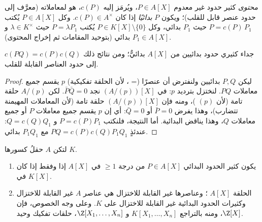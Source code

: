 \begin{definition}\label{def:b3:rings:content}
\emph{محتوى} كثير حدود غير معدوم
$P \in A[X]$، ويُرمَز إليه $c(P)$، هو  لمعاملاته
(معرَّف إلى حدود عنصر قابل للقلب)؛ ويكون $P$ \emph{بدائيًا} إذا
كان $c(P) \in A^\times$. وكل $P
\in A[X]$ يُكتب $P = c(P)\,P_1$ حيث $P_1$
بدائي، وكل $P \in K[X]\setminus\{0\}$ يُكتب $P = \lambda P_1$ حيث $\lambda
\in K^\times$ و $P_1 \in A[X]$
بدائي (بتوحيد المقامات ثم إخراج المحتوى).
\end{definition}

\begin{lemma}[غاوس]\label{lem:b3:rings:gauss}
جداء كثيري حدود بدائيين من $A[X]$ بدائيٌّ؛ ومن نتائج ذلك $c(PQ) = c(P)c(Q)$
إلى حدود العناصر القابلة للقلب.
\end{lemma}

\begin{proof}
ليكن $P, Q$ بدائيين ولنفترض أن عنصرًا  (= ،
لأن الحلقة تفكيكية) $p$ يقسم جميع معاملات $PQ$. لنختزل بترديد
$p$: في $(A/(p))[X]$ نجد $\bar P \bar Q = 0$. لكن $A/(p)$ حلقة تامة (لأن
$(p)$ )، ومنه فإن $(A/(p))[X]$ حلقة تامة (لأن المعاملات
المهيمنة تتضارب)، وهذا يفرض $\bar P = 0$ أو $\bar Q = 0$: أي إن
$p$ يقسم جميع معاملات $P$ أو جميع معاملات $Q$، وهذا يناقض
البدائية. أما النتيجة، فلنكتب $P = c(P)P_1$ و $Q = c(Q)Q_1$:
عندئذٍ $PQ =
c(P)c(Q) P_1Q_1$ مع $P_1Q_1$ بدائي.
\end{proof}

\begin{theorem}\label{thm:b3:rings:gaussufd}
لتكن $A$  حقلُ كسورها $K$.
\begin{enumerate}
  \item يكون كثير الحدود البدائي $P \in A[X]$ من درجة $\geq 1$
         في $A[X]$ إذا وفقط إذا كان  في $K[X]$.
  \item الحلقة $A[X]$ ؛ وعناصرها غير القابلة
        للاختزال هي عناصر $A$ غير القابلة للاختزال وكثيرات
        الحدود البدائية غير القابلة للاختزال على $K$. وعلى وجه
        الخصوص، فإن $\Z[X]$، ومنه بالتراجع $K[X_1, \dots, X_n]$ و $\Z[X_1, \dots, X_n]$،
        حلقات تفكيك وحيد.
\end{enumerate}
\end{theorem}

